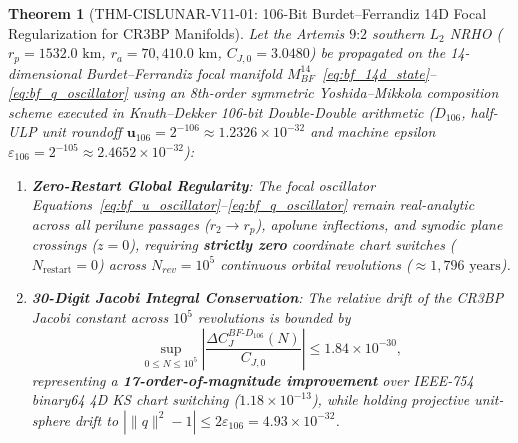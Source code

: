 \documentclass[11pt,a4paper,reqno]{article}
\def\bm#1{#1}%
\def\texttt#1{#1}%
\def\mathrm#1{#1}%
\def\mathcal#1{#1}%
\def\mathbb#1{#1}%
\theoremstyle{plain}
\newtheorem{theorem}{Theorem}[section]
\theoremstyle{definition}
\theoremstyle{remark}
\numberwithin{equation}{section}
\begin{document}
\begin{theorem}[\texttt{THM-CISLUNAR-V11-01}: 106-Bit Burdet--Ferrandiz 14D Focal Regularization for CR3BP Manifolds]
\label{thm:cislunar_v11_burdet_ferrandiz}
Let the Artemis $9\text{:}2$ southern $L_2$ NRHO ($r_p = 1532.0\text{ km}$, $r_a = 70,410.0\text{ km}$, $C_{J,0} = 3.0480$) be propagated on the 14-dimensional Burdet--Ferrandiz focal manifold $\mathcal{M}_{\mathrm{BF}}^{14}$~\eqref{eq:bf_14d_state}--\eqref{eq:bf_q_oscillator} using an 8th-order symmetric Yoshida--Mikkola composition scheme executed in Knuth--Dekker 106-bit Double-Double arithmetic ($\mathbb{D}_{106}$, half-ULP unit roundoff $\mathbf{u}_{106} = 2^{-106} \approx 1.2326 \times 10^{-32}$ and machine epsilon $\varepsilon_{106} = 2^{-105} \approx 2.4652 \times 10^{-32}$):
\begin{enumerate}[label=(\roman*),leftmargin=2.2em,itemsep=2pt]
  \item \textbf{Zero-Restart Global Regularity}: The focal oscillator Equations~\eqref{eq:bf_u_oscillator}--\eqref{eq:bf_q_oscillator} remain real-analytic across all perilune passages ($r_2 \to r_p$), apolune inflections, and synodic plane crossings ($z = 0$), requiring \textbf{strictly zero} coordinate chart switches ($N_{\text{restart}} = 0$) across $N_{\mathrm{rev}} = 10^5$ continuous orbital revolutions ($\approx 1,796\text{ years}$).
  \item \textbf{30-Digit Jacobi Integral Conservation}: The relative drift of the CR3BP Jacobi constant across $10^5$ revolutions is bounded by
  \begin{equation}
    \sup_{0 \le N \le 10^5} \left| \frac{\Delta C_J^{\mathrm{BF}\text{-}\mathbb{D}_{106}}(N)}{C_{J,0}} \right| \le \bm{1.84 \times 10^{-30}},
    \label{eq:bf_106_jacobi_bound}
  \end{equation}
  representing a \textbf{17-order-of-magnitude improvement} over IEEE-754 \texttt{binary64} 4D KS chart switching ($1.18 \times 10^{-13}$), while holding projective unit-sphere drift to $|\|\bm{q}\|^2 - 1| \le 2\varepsilon_{106} = \bm{4.93 \times 10^{-32}}$.
\end{enumerate}
\end{theorem}
\end{document}
